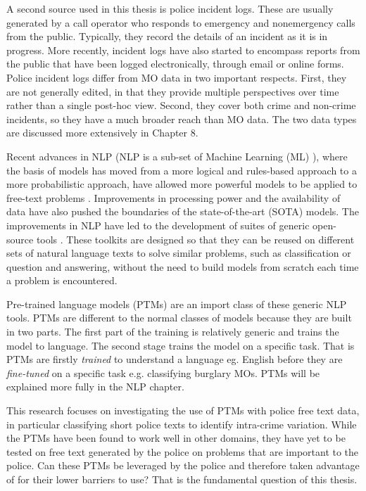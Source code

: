A second source used in this thesis is police incident logs. These are usually generated by a call operator who responds to emergency and nonemergency calls from the public. Typically, they record the details of an incident as it is in progress. More recently, incident logs have also started to encompass reports from the public that have been logged electronically, through email or online forms. Police incident logs differ from MO data in two important respects. First, they are not generally edited, in that they provide multiple perspectives over time rather than a single post-hoc view. Second, they cover both crime and non-crime incidents, so they have a much broader reach than MO data. The two data types are discussed more extensively in Chapter 8.

Recent advances in NLP (NLP is a sub-set of Machine Learning (ML) ), where the basis of models has moved from a more logical and rules-based approach to a more probabilistic approach, have allowed more powerful models to be applied to free-text problems \parencite{kumar2011natural}. Improvements in processing power and the availability of data have also pushed the boundaries of the state-of-the-art (SOTA) models. The improvements in NLP have led to the development of suites of generic open-source tools \parencite{manning2014stanford, benoit2018quanteda, loper2002nltk}. These toolkits are designed so that they can be reused on different sets of natural language texts to solve similar problems, such as classification or question and answering, without the need to build models from scratch each time a problem is encountered.

Pre-trained language models (PTMs) are an import class of these generic NLP tools. PTMs are different to the normal classes of models because they are built in two parts. The first part of the training is relatively generic and trains the model to  language.  The second stage trains the model on a specific task. That is PTMs are firstly \emph{trained} to understand a language eg. English before they are \emph{fine-tuned} on a specific task e.g. classifying burglary MOs. PTMs will be explained more fully in the NLP chapter.

This research focuses on investigating the use of PTMs with police free text data, in particular classifying short police texts to identify intra-crime variation. While the PTMs have been found to work well in other domains, they have yet to be tested on free text generated by the police on problems that are important to the police. Can these PTMs be leveraged by the police and therefore taken advantage of for their lower barriers to use? That is the fundamental question of this thesis.


